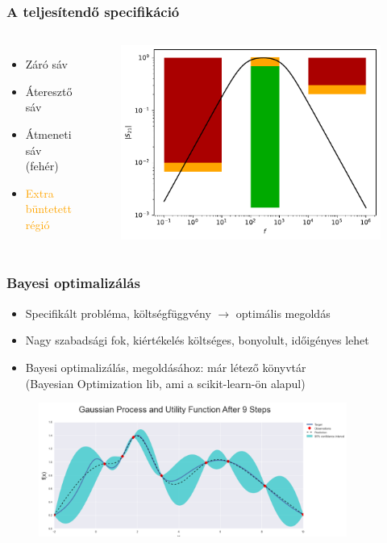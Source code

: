 \documentclass[aspectratio=43]{beamer}
\begin{document}
\begin{frame}
	\frametitle{A teljesítendő specifikáció}
	\begin{columns}
			\begin{itemize}
				\item \textcolor{stopred}{Záró sáv}
				\item \textcolor{passgreen}{Áteresztő sáv}
				\item Átmeneti sáv (fehér)
				\item \textcolor{orange}{Extra büntetett régió}
			\end{itemize}
			\begin{figure}
				\includegraphics[width=\textwidth]{plot.pdf}
			\end{figure}
	\end{columns}
\end{frame}

\begin{frame}
	\frametitle{Bayesi optimalizálás}
	\begin{itemize}
		\item Specifikált probléma, költségfüggvény $\rightarrow$ optimális megoldás
		\item Nagy szabadsági fok, kiértékelés költséges, bonyolult, időigényes lehet
		\item Bayesi optimalizálás, megoldásához: már létező könyvtár\\
		(Bayesian Optimization lib, ami a scikit-learn-ön alapul)
	\end{itemize}
	\begin{figure}
		\includegraphics[width=0.9\textwidth]{gauss.PNG}
	\end{figure}
\end{frame}
\end{document}

